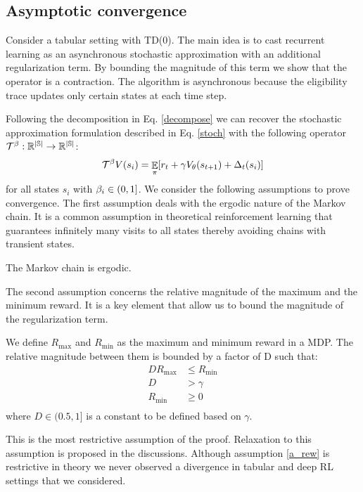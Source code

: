 \subsection{Asymptotic convergence}
Consider a tabular setting with TD(0). The main idea is to cast recurrent learning as an asynchronous stochastic approximation \cite{tsitsiklis1994asynchronous} with an additional regularization term. By bounding the magnitude of this term we show that the operator is a contraction. The algorithm is asynchronous because the eligibility trace updates only certain states at each time step.

Following the decomposition in Eq. \ref{decompose} we can recover the stochastic approximation formulation described in Eq. \ref{stoch} with the following operator $\mathcal{T}^{\beta}: \mathbb{R^{|\mathbb{S}|}} \rightarrow \mathbb{R^{|\mathbb{S}|}}$:
\begin{equation}
    \mathcal{T}^{\beta} V(s_i) = \mathop{\mathbb{E}}_{\pi}[r_t + \gamma V_{\theta}(s_{t+1}) + \Delta_t(s_i)]
\end{equation}
for all states $s_i$ with $\beta_i \in (0,1]$.
We consider the following assumptions to prove convergence.
The first assumption deals with the ergodic nature of the Markov chain. It is a common assumption in theoretical reinforcement learning that guarantees infinitely many visits to all states thereby avoiding chains with transient states.
\begin{assumption}
The Markov chain is ergodic.
\end{assumption}
The second assumption concerns the relative magnitude of the maximum and the minimum reward. It is a key element that allow us to bound the magnitude of the regularization term. 
\begin{assumption}
\label{a_rew}
We define $R_{\max}$ and $R_{\min}$ as the maximum and minimum reward in a MDP. The relative magnitude between them is bounded by a factor of D such that:
\begin{equation}
\begin{split}
    DR_{\text{max}}  &\leq R_{\text{min}}  \\
    D &> \gamma \\
    R_{\text{min}} &\geq 0\\
\end{split}
\end{equation}
where $D \in (0.5,1]$ is a constant to be defined based on $\gamma$.
\end{assumption}
This is the most restrictive assumption of the proof. Relaxation to this assumption is proposed in the discussions. Although assumption \ref{a_rew} is restrictive in theory we never observed a divergence in tabular and deep RL settings that we considered.

